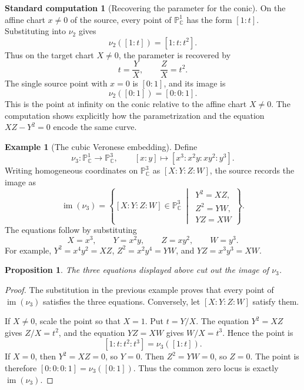 \documentclass[11pt]{article}
\newtheorem{proposition}[theorem]{Proposition}
\theoremstyle{definition}
\newtheorem{example}[theorem]{Example}
\newtheorem{calculation}[theorem]{Standard computation}
\theoremstyle{remark}
\newcommand{\C}{\mathbb{C}}
\newcommand{\Pj}{\mathbb{P}}
\newcommand{\image}{\operatorname{im}}
\begin{document}
\begin{calculation}[Recovering the parameter for the conic]
On the affine chart \(x\neq 0\) of the source, every point of
\(\Pj^1_{\C}\) has the form \([1:t]\).  Substituting into \(\nu_2\) gives
\[
  \nu_2([1:t])=[1:t:t^2].
\]
Thus on the target chart \(X\neq 0\), the parameter is recovered by
\[
  t=\frac{Y}{X},
  \qquad
  \frac{Z}{X}=t^2.
\]
The single source point with \(x=0\) is \([0:1]\), and its image is
\[
  \nu_2([0:1])=[0:0:1].
\]
This is the point at infinity on the conic relative to the affine chart
\(X\neq 0\).  The computation shows explicitly how the parametrization and
the equation \(XZ-Y^2=0\) encode the same curve.
\end{calculation}

\begin{example}[The cubic Veronese embedding]
Define
\[
  \nu_3\colon \Pj^1_{\C}\longrightarrow \Pj^3_{\C},
  \qquad
  [x:y]\longmapsto [x^3:x^2y:xy^2:y^3].
\]
Writing homogeneous coordinates on \(\Pj^3_{\C}\) as \([X:Y:Z:W]\), the
source records the image as
\[
  \image(\nu_3)
  =
  \left\{
  [X:Y:Z:W]\in \Pj^3_{\C}
  \ \middle|\
  \begin{array}{l}
    Y^2=XZ,\\
    Z^2=YW,\\
    YZ=XW
  \end{array}
  \right\}.
\]
The equations follow by substituting
\[
  X=x^3,\qquad Y=x^2y,\qquad Z=xy^2,\qquad W=y^3.
\]
For example, \(Y^2=x^4y^2=XZ\), \(Z^2=x^2y^4=YW\), and
\(YZ=x^3y^3=XW\).
\end{example}

\begin{proposition}
The three equations displayed above cut out the image of \(\nu_3\).
\end{proposition}

\begin{proof}
The substitution in the previous example proves that every point of
\(\image(\nu_3)\) satisfies the three equations.  Conversely, let
\([X:Y:Z:W]\) satisfy them.

If \(X\neq 0\), scale the point so that \(X=1\).  Put \(t=Y/X\).  The equation
\(Y^2=XZ\) gives \(Z/X=t^2\), and the equation \(YZ=XW\) gives
\(W/X=t^3\).  Hence the point is
\[
  [1:t:t^2:t^3]=\nu_3([1:t]).
\]
If \(X=0\), then \(Y^2=XZ=0\), so \(Y=0\).  Then \(Z^2=YW=0\), so \(Z=0\).
The point is therefore \([0:0:0:1]=\nu_3([0:1])\).  Thus the common zero locus
is exactly \(\image(\nu_3)\).
\end{proof}
\end{document}
